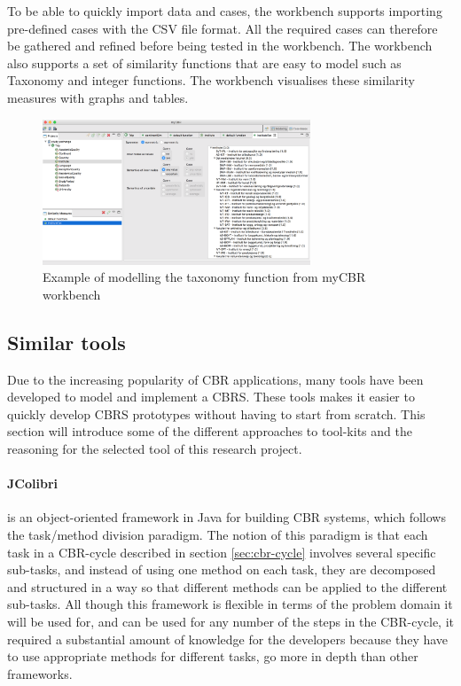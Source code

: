 To be able to quickly import data and cases, the workbench supports importing pre-defined cases with the CSV file format. All the required cases can therefore be gathered and refined before being tested in the workbench. The workbench also supports a set of similarity functions that are easy to model such as Taxonomy and integer functions. The workbench visualises these similarity measures with graphs and tables.

\begin{figure}[H]
    \centering
    \includegraphics[width=8cm]{fig/myCBRworkbench.png}
    \caption{Example of modelling the taxonomy function from myCBR workbench}
\end{figure}

\subsection{Similar tools}
Due to the increasing popularity of CBR applications\cite{kolodner2014case}, many tools have been developed to model and implement a CBRS. These tools makes it easier to quickly develop CBRS prototypes without having to start from scratch. This section will introduce some of the different approaches to tool-kits and the reasoning for the selected tool of this research project. 

\paragraph{JColibri}
is an object-oriented framework in Java for building CBR systems, which follows the task/method division paradigm.\cite{bello2004jcolibri} The notion of this paradigm is that each task in a CBR-cycle described in section \ref{sec:cbr-cycle} involves several specific sub-tasks, and instead of using one method on each task, they are decomposed and structured in a way so that different methods can be applied to the different sub-tasks. All though this framework is flexible in terms of the problem domain it will be used for, and can be used for any number of the steps in the CBR-cycle, it required a substantial amount of knowledge for the developers because they have to use appropriate methods for different tasks, go more in depth than other frameworks.

